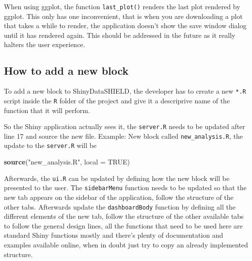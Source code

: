 \documentclass[
]{book}
\newenvironment{Shaded}{\begin{snugshade}}{\end{snugshade}}
\newcommand{\ControlFlowTok}[1]{\textcolor[rgb]{0.13,0.29,0.53}{\textbf{#1}}}
\newcommand{\DataTypeTok}[1]{\textcolor[rgb]{0.13,0.29,0.53}{#1}}
\newcommand{\KeywordTok}[1]{\textcolor[rgb]{0.13,0.29,0.53}{\textbf{#1}}}
\newcommand{\NormalTok}[1]{#1}
\newcommand{\OperatorTok}[1]{\textcolor[rgb]{0.81,0.36,0.00}{\textbf{#1}}}
\newcommand{\OtherTok}[1]{\textcolor[rgb]{0.56,0.35,0.01}{#1}}
\newcommand{\StringTok}[1]{\textcolor[rgb]{0.31,0.60,0.02}{#1}}
\begin{document}
\begin{Shaded}
\end{Shaded}

When using ggplot, the function \texttt{last\_plot()} renders the last plot rendered by ggplot. This only has one inconvenient, that is when you are downloading a plot that takes a while to render, the application doesn't show the save window dialog until it has rendered again. This should be addressed in the future as it really halters the user experience.

\hypertarget{how-to-add-a-new-block}{%
\subsection{How to add a new block}\label{how-to-add-a-new-block}}

To add a new block to ShinyDataSHIELD, the developer has to create a new \texttt{*.R} script inside the \texttt{R} folder of the project and give it a descriprive name of the function that it will perform.

So the Shiny application actually sees it, the \texttt{server.R} needs to be updated after line 17 and source the new file. Example: New block called \texttt{new\_analysis.R}, the update to the \texttt{server.R} will be

\begin{Shaded}
\begin{Highlighting}[]
\KeywordTok{source}\NormalTok{(}\StringTok{"new_analysis.R"}\NormalTok{, }\DataTypeTok{local =} \OtherTok{TRUE}\NormalTok{)}
\end{Highlighting}
\end{Shaded}

Afterwards, the \texttt{ui.R} can be updated by defining how the new block will be presented to the user. The \texttt{sidebarMenu} function needs to be updated so that the new tab appears on the sidebar of the application, follow the structure of the other tabs. Afterwards update the \texttt{dashboardBody} function by defining all the different elements of the new tab, follow the structure of the other available tabs to follow the general design lines, all the functions that need to be used here are standard Shiny functions mostly and there's plenty of documentation and examples available online, when in doubt just try to copy an already implemented structure.
\end{document}
